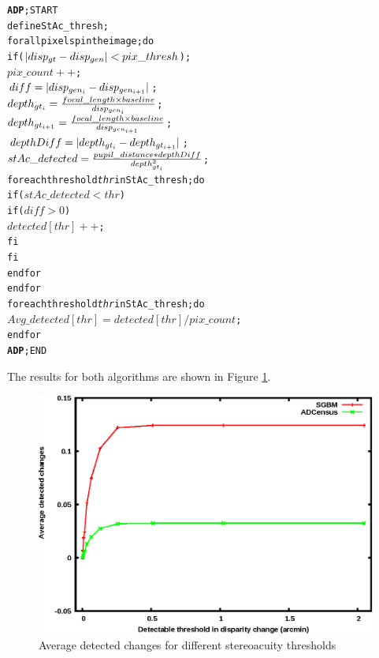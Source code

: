 \begin{alltt}
\textbf{ADP}; START
      define StAc\_thresh;
      for all pixels p in the image; do
         if (\( |disp\sb{gt}-disp\sb{gen}|<pix\_thresh\));
            \(pix\_count++\);
            \(diff = |disp\sb{gen\sb{i}}-disp\sb{gen\sb{i+1}}|\);
            \(depth\sb{gt\sb{i}} = \frac{focal\_length \times baseline}{disp\sb{gen\sb{i}}}\);
            \(depth\sb{gt\sb{i+1}} = \frac{focal\_length \times baseline}{disp\sb{gen\sb{i+1}}}\);
            \(depthDiff = |depth\sb{gt\sb{i}}-depth\sb{gt\sb{i+1}}|\);
            \(stAc\_detected = \frac{pupil\_distance*depthDiff}{depth\sb{gt\sb{i}}\sp{2}}\);
            for each threshold \textit{thr} in StAc\_thresh; do
               if (\(stAc\_detected<thr\))
                  if (\(diff>0\))
                     \(detected[thr]++\);
                  fi
               fi
            end for
      end for
      for each threshold \textit{thr} in StAc\_thresh; do
         \(Avg\_detected[thr] = detected[thr]/pix\_count\);
      end for
\textbf{ADP}; END
\end{alltt}
The results for both algorithms are shown in Figure \ref{fig:algthresh}.

\begin{figure}[H]
\centering
\includegraphics{algthreshBoth}
\caption{Average detected changes for different stereoacuity thresholds}
\label{fig:algthresh}
\end{figure} 


